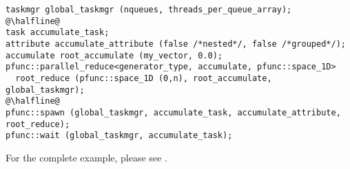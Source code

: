 \begin{center}
\begin{minipage}{0.7\textwidth}
\begin{lstlisting}
taskmgr global_taskmgr (nqueues, threads_per_queue_array);
@\halfline@
task accumulate_task;
attribute accumulate_attribute (false /*nested*/, false /*grouped*/);
accumulate root_accumulate (my_vector, 0.0);
pfunc::parallel_reduce<generator_type, accumulate, pfunc::space_1D> 
  root_reduce (pfunc::space_1D (0,n), root_accumulate, global_taskmgr);
@\halfline@
pfunc::spawn (global_taskmgr, accumulate_task, accumulate_attribute, root_reduce);
pfunc::wait (global_taskmgr, accumulate_task);
\end{lstlisting}
\end{minipage}
\end{center}
%
For the complete example, please see .

